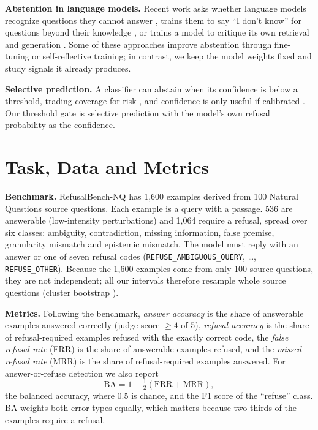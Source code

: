 \documentclass[conference]{IEEEtran}
\begin{document}
\textbf{Abstention in language models.} Recent work asks whether language models recognize questions they cannot answer \cite{yin2023know}, trains them to say ``I don't know'' for questions beyond their knowledge \cite{zhang2024rtuning}, or trains a model to critique its own retrieval and generation \cite{asai2023selfrag}. Some of these approaches improve abstention through fine-tuning or self-reflective training; in contrast, we keep the model weights fixed and study signals it already produces.

\textbf{Selective prediction.} A classifier can abstain when its confidence is below a threshold, trading coverage for risk \cite{geifman2017selective}, and confidence is only useful if calibrated \cite{guo2017calibration}. Our threshold gate is selective prediction with the model's own refusal probability as the confidence.

\section{Task, Data and Metrics}
\textbf{Benchmark.} RefusalBench-NQ has 1{,}600 examples derived from 100 Natural Questions source questions. Each example is a query with a passage. 536 are answerable (low-intensity perturbations) and 1{,}064 require a refusal, spread over six classes: ambiguity, contradiction, missing information, false premise, granularity mismatch and epistemic mismatch. The model must reply with an answer or one of seven refusal codes (\texttt{REFUSE\_AMBIGUOUS\_QUERY}, \dots, \texttt{REFUSE\_OTHER}). Because the 1{,}600 examples come from only 100 source questions, they are not independent; all our intervals therefore resample whole source questions (cluster bootstrap \cite{cameron2008bootstrap,efron1993bootstrap}).

\textbf{Metrics.} Following the benchmark, \emph{answer accuracy} is the share of answerable examples answered correctly (judge score $\ge4$ of 5), \emph{refusal accuracy} is the share of refusal-required examples refused with the exactly correct code, the \emph{false refusal rate} (FRR) is the share of answerable examples refused, and the \emph{missed refusal rate} (MRR) is the share of refusal-required examples answered. For answer-or-refuse detection we also report
\begin{equation}
\text{BA} = 1-\tfrac{1}{2}(\text{FRR}+\text{MRR}),
\end{equation}
the balanced accuracy, where 0.5 is chance, and the F1 score of the ``refuse'' class. BA weights both error types equally, which matters because two thirds of the examples require a refusal.
\end{document}
